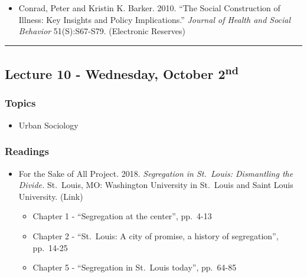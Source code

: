 \documentclass[]{book}
\providecommand{\tightlist}{%
  \setlength{\itemsep}{0pt}\setlength{\parskip}{0pt}}
\begin{document}
\begin{itemize}
\tightlist
\item
  Conrad, Peter and Kristin K. Barker. 2010. ``The Social Construction of Illness: Key Insights and Policy Implications.'' \emph{Journal of Health and Social Behavior} 51(S):S67-S79. (Electronic Reserves)
\end{itemize}

\begin{center}\rule{0.5\linewidth}{\linethickness}\end{center}

\hypertarget{lecture-10---wednesday-october-2nd}{%
\subsection*{\texorpdfstring{Lecture 10 - Wednesday, October 2\textsuperscript{nd}}{Lecture 10 - Wednesday, October 2nd}}\label{lecture-10---wednesday-october-2nd}}

\hypertarget{topics-11}{%
\subsubsection*{Topics}\label{topics-11}}

\begin{itemize}
\tightlist
\item
  Urban Sociology
\end{itemize}

\hypertarget{readings-10}{%
\subsubsection*{Readings}\label{readings-10}}

\begin{itemize}
\tightlist
\item
  For the Sake of All Project. 2018. \emph{Segregation in St.~Louis: Dismantling the Divide.} St.~Louis, MO: Washington University in St.~Louis and Saint Louis University. (Link)

  \begin{itemize}
  \tightlist
  \item
    Chapter 1 - ``Segregation at the center'', pp.~4-13
  \item
    Chapter 2 - ``St.~Louis: A city of promise, a history of segregation'', pp.~14-25
  \item
    Chapter 5 - ``Segregation in St.~Louis today'', pp.~64-85
  \end{itemize}
\end{itemize}
\end{document}
